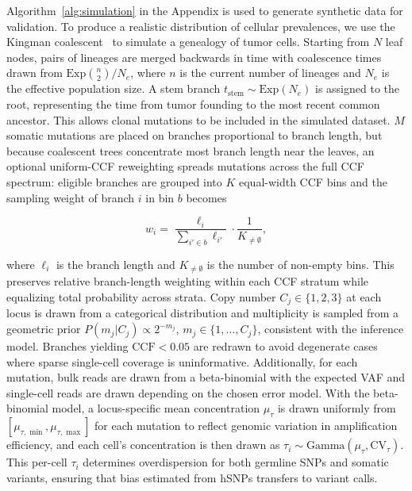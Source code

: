 \documentclass[10pt]{article}
\begin{document}
Algorithm~\ref{alg:simulation} in the Appendix is used to generate synthetic data for validation.
To produce a realistic distribution of cellular prevalences, we use the Kingman coalescent~\cite{kingman1982} to simulate a genealogy of tumor cells.
Starting from $N$ leaf nodes, pairs of lineages are merged backwards in time with coalescence times drawn from $\text{Exp}\binom{n}{2}/N_e$, where $n$ is the current number of lineages and $N_e$ is the effective population size.
A stem branch $t_{\text{stem}} \sim \text{Exp}(N_e)$ is assigned to the root, representing the time from tumor founding to the most recent common ancestor.
This allows clonal mutations to be included in the simulated dataset.
$M$ somatic mutations are placed on branches proportional to branch length, but because coalescent trees concentrate most branch length near the leaves, an optional uniform-CCF reweighting spreads mutations across the full CCF spectrum: eligible branches are grouped into $K$ equal-width CCF bins and the sampling weight of branch $i$ in bin $b$ becomes

\begin{equation}
    w_i = \frac{\ell_i}{\sum_{i' \in b} \ell_{i'}} \cdot \frac{1}{K_{\neq\emptyset}}
    \label{eq:ccf-reweight}
    ,
\end{equation}

where $\ell_i$ is the branch length and $K_{\neq\emptyset}$ is the number of non-empty bins.
This preserves relative branch-length weighting within each CCF stratum while equalizing total probability across strata.
Copy number $C_j \in \{1, 2, 3\}$ at each locus is drawn from a categorical distribution and multiplicity is sampled from a geometric prior $P(m_j | C_j) \propto 2^{-m_j}$, $m_j \in \{1, \ldots, C_j\}$, consistent with the inference model.
Branches yielding $\text{CCF} < 0.05$ are redrawn to avoid degenerate cases where sparse single-cell coverage is uninformative.
Additionally, for each mutation, bulk reads are drawn from a beta-binomial with the expected VAF and single-cell reads are drawn depending on the chosen error model.
With the beta-binomial model, a locus-specific mean concentration $\mu_\tau$ is drawn uniformly from $[\mu_{\tau,\min}, \mu_{\tau,\max}]$ for each mutation to reflect genomic variation in amplification efficiency, and each cell's concentration is then drawn as $\tau_i \sim \text{Gamma}(\mu_\tau, \text{CV}_\tau)$.
This per-cell $\tau_i$ determines overdispersion for both germline SNPs and somatic variants, ensuring that bias estimated from hSNPs transfers to variant calls.
\end{document}
